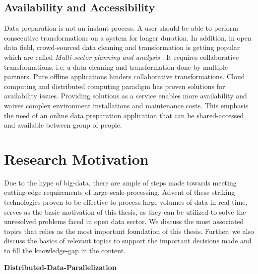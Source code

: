 \subsection{Availability and Accessibility}
\noindent Data preparation is not an instant process. A user should be able to perform consecutive transformations on a system for longer duration. In addition, in open data field, crowd-sourced data cleaning and transformation is getting popular which are called \textit{Multi-sector planning and analysis} \cite{multisectoranalysis}. It requires collaborative transformations, i.e. a data cleaning and transformation done by multiple partners. Pure offline applications hinders collaborative transformations. Cloud computing and distributed computing paradigm has proven solutions for availability issues. Providing solutions as a service enables more availability and waives complex environment installations and maintenance costs. This emphasis the need of an online data preparation application that can be shared-accessed and available between group of people.
\section{Research Motivation}
Due to the hype of big-data, there are ample of steps made towards meeting cutting-edge requirements of large-scale-processing. Advent of these striking technologies proven to be effective to process large volumes of data in real-time, serves as the basic motivation of this thesis, as they can be utilized to solve the unresolved problems faced in open data sector. We discuss the most associated topics that relies as the most important foundation of this thesis. Further, we also discuss the basics of relevant topics to support the important decisions made and to fill the knowledge-gap in the content. 

\textbf{Distributed-Data-Parallelization}


